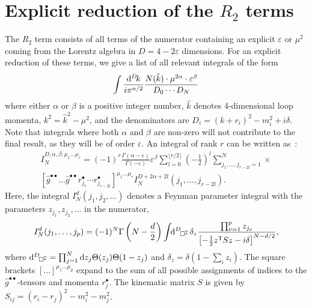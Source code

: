 \chapter{Explicit reduction of the $R_2$ terms}
\label{app:r2}
The $R_2$ term \cite{Ossola:2008xq} consists of all terms of the numerator
containing an explicit $\varepsilon$ or $\mu^2$ coming from the Lorentz
algebra in $D=4-2\varepsilon$ dimensions. 
For an explicit reduction of these terms, we give a list of all relevant integrals of the form
\begin{align}
\int\frac{\diff[D] k}{i\pi^{n/2}}
\frac{N(\hat{k})\cdot\mu^{2\alpha}\cdot\varepsilon^\beta}{D_0\cdots D_N}
\end{align}
where either $\alpha$ or $\beta$ is a positive integer number, 
$\hat{k}$ denotes 4-dimensional loop momenta, $k^2=\hat{k}^2-\mu^2$, 
and the denominators are $D_i=(k+r_i)^2-m_i^2+i\delta$.
Note that integrals where both $\alpha$ and $\beta$ are
non-zero will not contribute to the final result, as they will be of order $\varepsilon$.
An integral of rank $r$ 
can be written as~\cite{Binoth:2005ff,Reiter:2009kb}:
\begin{multline}
I_N^{D,\alpha,\beta;\mu_1\ldots\mu_r}=
(-1)^{r}\frac{\Gamma(\alpha-\varepsilon)}{\Gamma(-\varepsilon)}
\varepsilon^\beta
\sum_{l=0}^{\lfloor r/2\rfloor}\left(-\frac12\right)^l
\sum_{j_1,\ldots,j_{r-2l}=1}^N
\times\\
\left[\hat{g}^{\bullet\bullet}\ldots
\hat{g}^{\bullet\bullet}r_{j_1}^\bullet
\cdots r_{j_{r-2l}}^\bullet\right]^{\mu_1\ldots\mu_r}
I_N^{D+2\alpha+2l}(j_1,\ldots,j_{r-2l}).
\end{multline}
Here, the integral $I_N^d(j_1,j_2,\ldots)$ denotes a Feynman parameter
integral with the parameters $z_{j_1}, z_{j_2}, \ldots$ in the numerator,
\begin{equation}
I_N^d(j_1,\ldots, j_p)=
(-1)^N\Gamma\left(N-\frac{d}2\right)%
\int\!\!\diff[D]_\Box\!z\,\delta_z
\frac{\prod_{\nu=1}^p z_{j_\nu}}{%
\left[-\frac12 z^{\mathsf{T}}Sz-i\delta\right]^{N-d/2}},
\end{equation}
where $\diff[D]_\Box\!z=
\prod_{j=1}^N\mathrm{d}z_j\Theta(z_j)\Theta(1-z_j)$
and $\delta_z=\delta(1-\sum_i z_i)$.
The square brackets $[\ldots]^{\mu_1\ldots\mu_p}$ expand to the sum of
all possible assignments of indices to the $\hat{g}^{\bullet\bullet}$-tensors
and momenta $r_j^\bullet$. 
The kinematic matrix $S$ is given by $S_{ij}=(r_i-r_j)^2-m_i^2-m_j^2$.

